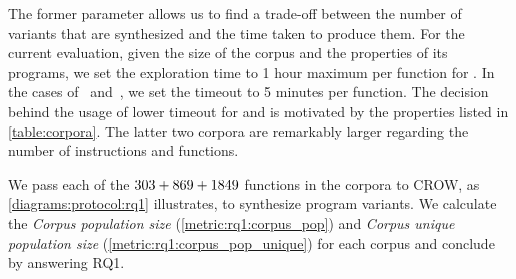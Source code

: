 The former parameter allows us to find a trade-off between the number of variants that are synthesized and the time taken to produce them. For the current evaluation, given the size of the corpus and the properties of its programs, we set the exploration time to 1 hour maximum per function for \corpusrosetta. In the cases of \corpussodium\ and\ \corpusqrcode, we set the timeout to 5 minutes per function. The decision behind the usage of lower timeout for \corpussodium
and \corpusqrcode is motivated by the properties listed in \autoref{table:corpora}. The latter two corpora are remarkably larger regarding the number of instructions and functions. 

We pass each of the $303 + 869 + 1849$ functions in the corpora to CROW, as \autoref{diagrams:protocol:rq1} illustrates, to synthesize program variants. We calculate the \emph{Corpus population size} (\autoref{metric:rq1:corpus_pop}) and \emph{Corpus unique population size} (\autoref{metric:rq1:corpus_pop_unique}) for each corpus and conclude by answering RQ1.
